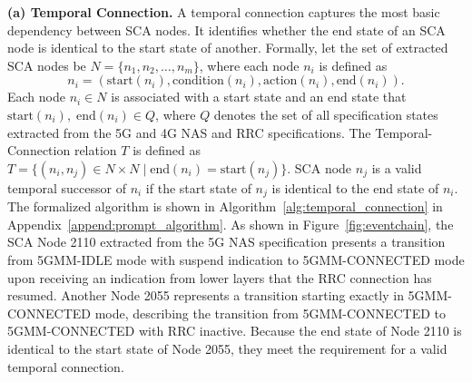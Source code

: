 \documentclass[sigconf]{acmart}
\begin{document}
{\noindent \textbf{(a) Temporal Connection.} 
A temporal connection captures the most basic dependency between SCA nodes. It identifies whether the end state of an SCA node is identical to the start state of another. Formally, let the set of extracted SCA nodes be $N = \{n_1, n_2, \ldots, n_m \}$, where each node $n_i$ is defined as   
\[
n_i = (\text{start}(n_i), \text{condition}(n_i), \text{action}(n_i), \text{end}(n_i)).
\]
\noindent Each node $n_i \in N$ is associated with a start state and an end state that $\text{start}(n_i), \; \text{end}(n_i) \in Q$, where $Q$ denotes the set of all specification states extracted from the 5G and 4G NAS and RRC specifications. 
The Temporal-Connection relation \( T \) is defined as 
\(T = \{ (n_i, n_j) \in N \times N \mid \text{end}(n_i) = \text{start}(n_j) \} \). 
SCA node \(n_j\) is a valid temporal successor of \(n_i\) if the start state of \(n_j\) is identical to the end state of \(n_i\). 
The formalized algorithm is shown in Algorithm~\ref{alg:temporal_connection} in Appendix~\ref{append:prompt_algorithm}.
As shown in Figure~\ref{fig:eventchain}, the SCA Node 2110 extracted from the 5G NAS specification presents a transition from 5GMM-IDLE mode with suspend indication to 5GMM-CONNECTED mode upon receiving an indication from lower layers that the RRC connection has resumed. Another Node 2055 represents a transition starting exactly in 5GMM-CONNECTED mode, describing the transition from 5GMM-CONNECTED to 5GMM-CONNECTED with RRC inactive. Because the end state of Node 2110 is identical to the start state of Node 2055, they meet the requirement for a valid temporal connection. 

}
\end{document}
